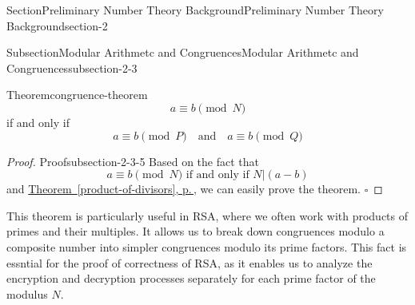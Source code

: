 \documentclass[oneside,12pt,]{article}
\newcommand{\xreffont}{\relax}
\numberwithin{equation}{section}
\begin{document}
\begin{sectionptx}{Section}{Preliminary Number Theory Background}{}{Preliminary Number Theory Background}{}{}{section-2}
\begin{subsectionptx}{Subsection}{Modular Arithmetc and Congruences}{}{Modular Arithmetc and Congruences}{}{}{subsection-2-3}
\begin{theorem}{Theorem}{}{}{congruence-theorem}
\begin{equation*}
a \equiv b \pmod{N}
\end{equation*}
if and only if%
\begin{equation*}
a \equiv b \pmod{P} \quad \text{and} \quad a \equiv b \pmod{Q}
\end{equation*}
%
\end{theorem}
\begin{proof}{Proof}{}{subsection-2-3-5}
Based on the fact that%
\begin{equation*}
a \equiv b \pmod{N} \text{ if and only if } N|(a-b)
\end{equation*}
and \hyperref[product-of-divisors]{Theorem~{\xreffont\ref{product-of-divisors}}, p.\,\pageref{product-of-divisors}}, we can easily prove the theorem. \(\square\)%
\end{proof}
This theorem is particularly useful in RSA, where we often work with products of primes and their multiples. It allows us to break down congruences modulo a composite number into simpler congruences modulo its prime factors. This fact is essntial for the proof of correctness of RSA, as it enables us to analyze the encryption and decryption processes separately for each prime factor of the modulus \(N\).%
\end{subsectionptx}
\end{sectionptx}
%
%
\typeout{************************************************}
\typeout{************************************************}
%
\end{document}
